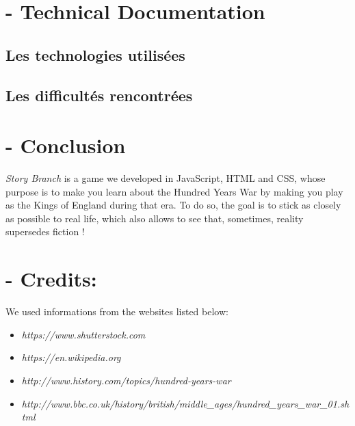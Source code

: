 \documentclass{scrreprt}
\begin{document}
{\let\clearpage\relax \chapter{- Technical Documentation}}

\section{Les technologies utilisées}

\section*{Les difficultés rencontrées}

{\let\clearpage\relax \chapter{- Conclusion}}
\textit{Story Branch} is a game we developed in JavaScript, HTML and CSS, whose purpose is to make you learn about the Hundred Years War by making you play as the Kings of England during that era. To do so, the goal is to stick as closely as possible to real life, which also allows to see that, sometimes, reality supersedes fiction !


{\let\clearpage\relax \chapter{- Credits:}}

We used informations from the websites listed below:
\begin{itemize}
\item \textit{https://www.shutterstock.com}
\item \textit{https://en.wikipedia.org}
\item \textit{http://www.history.com/topics/hundred-years-war}
\item \textit{http://www.bbc.co.uk/history/british/middle_ages/hundred_years_war_01.shtml}
\end{itemize}
\end{document}
